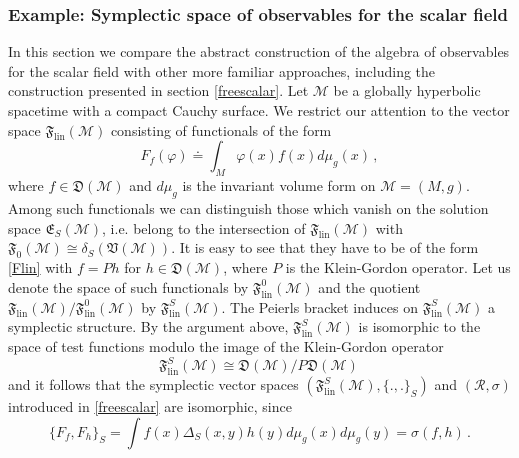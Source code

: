 \documentclass[12pt]{article}
\newcommand{\E}{\mathfrak{E}}
\newcommand{\V}{\mathfrak{V}}
\newcommand{\D}{\mathfrak{D}}
\newcommand{\F}{\mathfrak{F}}
\newcommand{\Mcal}{\mathcal{M}}
\newcommand{\Rcal}{\mathcal{R}}
\newcommand{\ph}{\varphi}
\newcommand{\1}{\mathds{1}}                         %
\newcommand{\be}{\begin{equation}}
\newcommand{\ee}{\end{equation}}
\begin{document}
{\subsubsection{Example: Symplectic space of observables for the scalar field}\label{symplectic}
In this section we compare the abstract construction of the algebra of observables for the scalar field with other more familiar approaches, including the construction presented in section \ref{freescalar}. Let $\Mcal$ be a globally hyperbolic spacetime with a compact Cauchy surface. We restrict our attention to the vector space $\F_{\textrm{lin}}(\Mcal)$ consisting of functionals of the form
\be\label{Flin}
F_f(\ph)\doteq \int_M \ph(x)f(x)d\mu_g(x)\,,
\ee
where $f\in\D(\Mcal)$ and $d\mu_g$ is the invariant volume form on $\Mcal=(M,g)$. Among such functionals we can distinguish those which vanish on the solution space $\E_S(\Mcal)$, i.e. belong to the intersection of $\F_{\textrm{lin}}(\Mcal)$ with $\F_0(\Mcal)\cong\delta_S(\V(\Mcal))$. It is easy to see that they have to be of the form \eqref{Flin} with $f=Ph$ for $h\in\D(\Mcal)$, where $P$ is the Klein-Gordon operator. Let us denote the space of such functionals by $\F^0_{\textrm{lin}}(\Mcal)$ and the quotient $\F_{\textrm{lin}}(\Mcal)/\F^0_{\textrm{lin}}(\Mcal)$ by $\F^S_{\textrm{lin}}(\Mcal)$. The Peierls bracket induces on $\F^S_{\textrm{lin}}(\Mcal)$ a symplectic structure. By the argument above, $\F^S_{\textrm{lin}}(\Mcal)$ is isomorphic to the space of test functions modulo the image of the Klein-Gordon operator 
\[
\F^S_{\textrm{lin}}(\Mcal) \cong \D(\Mcal) / P \D(\Mcal)\,
\]
and it follows that the symplectic vector spaces $(\F^S_{\textrm{lin}}(\Mcal),\{.,.\}_S)$ and $(\Rcal,\sigma)$ introduced in \ref{freescalar} are isomorphic, since
\[
\{F_f,F_{h}\}_S=\int f(x)\Delta_S(x,y)h(y)d\mu_g(x)d\mu_g(y)=\sigma(f,h) \,.
\]
}
\end{document}
